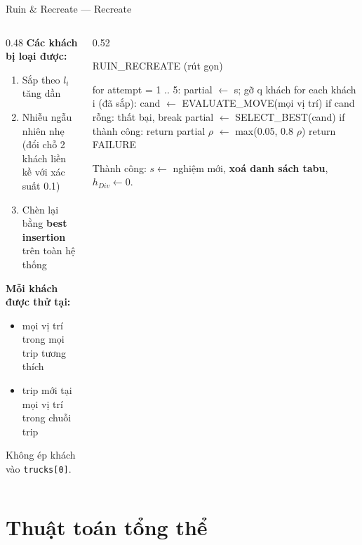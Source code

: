 \documentclass[aspectratio=169]{beamer}
\newcommand{\hl}[1]{\textcolor{blue!60!black}{\textbf{#1}}}
\newenvironment{pseudo}{\par\scriptsize\ttfamily\obeylines\obeyspaces}{\par}
\newcommand{\ind}{\hspace*{1.2em}}
\begin{document}
\begin{frame}[fragile]{Ruin \& Recreate — Recreate}
  \begin{columns}[T]
    \begin{column}{0.48\textwidth}
      \textbf{Các khách bị loại được:}
      \begin{enumerate}
        \item \small Sắp theo $l_i$ tăng dần
        \item \small Nhiễu ngẫu nhiên nhẹ (đổi chỗ 2 khách liền kề với xác suất 0.1)
        \item \small Chèn lại bằng \hl{best insertion} trên toàn hệ thống
      \end{enumerate}
      \textbf{Mỗi khách được thử tại:}
      \begin{itemize}
        \item \small mọi vị trí trong mọi trip tương thích
        \item \small trip mới tại mọi vị trí trong chuỗi trip
      \end{itemize}
      \small Không ép khách vào \texttt{trucks[0]}.
    \end{column}
    \begin{column}{0.52\textwidth}
      \begin{block}{RUIN\_RECREATE (rút gọn)}
        \begin{pseudo}
for attempt = 1 .. 5:
\ind partial $\leftarrow$ s; gỡ q khách
\ind for each khách i (đã sắp):
\ind\ind cand $\leftarrow$ EVALUATE\_MOVE(mọi vị trí)
\ind\ind if cand rỗng: thất bại, break
\ind\ind partial $\leftarrow$ SELECT\_BEST(cand)
\ind if thành công: return partial
\ind $\rho$ $\leftarrow$ max(0.05, 0.8 $\rho$)
return FAILURE
        \end{pseudo}
      \end{block}
      \small Thành công: $s \leftarrow$ nghiệm mới, \hl{xoá danh sách tabu}, $h_{Div} \leftarrow 0$.
    \end{column}
  \end{columns}
\end{frame}

\section{Thuật toán tổng thể}
\end{document}
